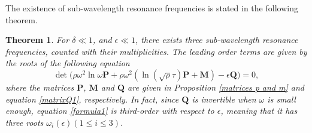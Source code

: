 \documentclass[10pt,reqno,oneside]{amsart}%
\newtheorem{thm}{Theorem}[section]
\theoremstyle{definition}
\theoremstyle{remark}
\numberwithin{equation}{section}
\numberwithin{equation}{section}
\begin{document}
The existence of sub-wavelength resonance frequencies is stated in the following theorem.
\begin{thm}\label{thmomega}
For $\delta\ll 1$, and $\epsilon\ll 1$, there exists three sub-wavelength resonance frequencies, counted with their multiplicities. The leading order terms are given by the roots of the following equation
\begin{equation}\label{formula1}
\det\Big(  \rho\omega^2\ln\omega\mathbf{P}+\rho\omega^2\left(\ln{(\sqrt{\rho}\tau)}\mathbf{P}
+\mathbf{M}\right)-\epsilon\mathbf{Q}\Big)=0,
\end{equation}
where the matrices $\mathbf{P}$, $\mathbf{M}$ and $\mathbf{Q}$ are given in Proposition \ref{matrices p and m} and equation \eqref{matrixQ1}, respectively. In fact, since $\mathbf{Q}$ is invertible when $\omega$ is small enough, equation \eqref{formula1} is third-order with respect to $\epsilon$, meaning that it has three roots $\omega_{i}(\epsilon)(1\leq i\leq3)$.
\end{thm}
\end{document}
